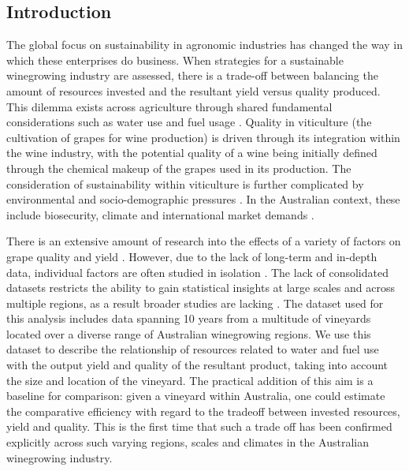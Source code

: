 \documentclass[review,12pt,authoryear]{elsarticle}
\begin{document}
\begin{linenumbers}

\section{Introduction}
The global focus on sustainability in agronomic industries has changed the way in which these enterprises do business. When strategies for a sustainable winegrowing industry are assessed, there is a trade-off between balancing the amount of resources invested and the resultant yield versus quality produced. This dilemma exists across agriculture through shared fundamental considerations such as water use and fuel usage \citep{hemmingCherryTomatoProduction2020,kawasakiQualityMattersMore2016, zhuEffectsNitrogenLevel2017}. Quality in viticulture (the cultivation of grapes for wine production) is driven through its integration within the wine industry, with the potential quality of a wine being initially defined through the chemical makeup of the grapes used in its production. The consideration of sustainability within viticulture is further complicated by environmental and socio-demographic pressures \citep{santiago-brownSustainabilityAssessmentWineGrape2015}. In the Australian context, these include biosecurity, climate and international market demands \citep{canadellMultidecadalIncreaseForest2021,longbottomRoleVineyardPractices2015,oliverReviewSoilPhysical2013}.
\par
There is an extensive amount of research into the effects of a variety of factors on grape quality and yield \citep{heFruitYieldPrediction2022,laurentLocalInfluenceClimate2022,liakosMachineLearningAgriculture2018}. However, due to the lack of long-term and in-depth data, individual factors are often studied in isolation \citep{abbalDecisionSupportSystem2016}. The lack of consolidated datasets restricts the ability to gain statistical insights at large scales and across multiple regions, as a result broader studies are lacking \citep{keithjonesAustralianWineIndustry2002,knightFirmResourcesDevelopment2019}. The dataset used for this analysis includes data spanning 10 years from a multitude of vineyards located over a diverse range of Australian winegrowing regions. We use this dataset to describe the relationship of resources related to water and fuel use with the output yield and quality of the resultant product, taking into account the size and location of the vineyard. The practical addition of this aim is a baseline for comparison: given a vineyard within Australia, one could estimate the comparative efficiency with regard to the tradeoff between invested resources, yield and quality. This is the first time that such a trade off has been confirmed explicitly across such varying regions, scales and climates in the Australian winegrowing industry.

\end{linenumbers}
\end{document}

